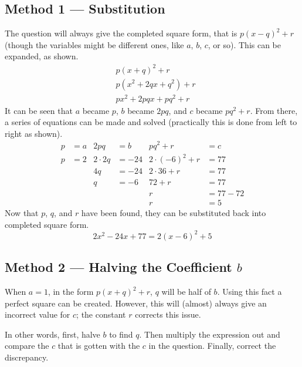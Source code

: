 \subsection{Method 1 — Substitution}
The question will always give the completed square form, that is $p(x - q)^2+r$ (though the variables might be different ones, like $a$, $b$, $c$, or so). This can be expanded, as shown.
\begin{align*}
	&p(x+q)^2+r\\
	&p(x^2+2qx+q^2)+r\\
	&px^2+2pqx+pq^2+r
\end{align*}
It can be seen that $a$ became $p$, $b$ became $2pq$, and $c$ became $pq^2+r$. From there, a series of equations can be made and solved (practically this is done from left to right as shown).
\begin{align*}
	p &= a & 2pq &= b         & pq^2+r &= c\\
	p &= 2 & 2 \cdot 2q &=-24 & 2 \cdot (-6)^2 + r &= 77\\
	  &    & 4q &= -24        & 2 \cdot 36 + r &= 77\\
	  &    & q &= -6          & 72 + r &= 77\\
	  &    & &                & r &= 77 - 72\\
	  &    & &                & r &= 5
\end{align*}
Now that $p$, $q$, and $r$ have been found, they can be substituted back into completed square form.
\begin{equation*}
	2x^2-24x+77 = 2(x-6)^2+5
\end{equation*}

\subsection{Method 2 — Halving the Coefficient $b$}
When $a=1$, in the form $p(x+q)^2+r$, $q$ will be half of $b$. Using this fact a perfect square can be created. However, this will (almost) always give an incorrect value for $c$; the constant $r$ corrects this issue.

In other words, first, halve $b$ to find $q$. Then multiply the expression out and compare the $c$ that is gotten with the $c$ in the question. Finally, correct the discrepancy.

